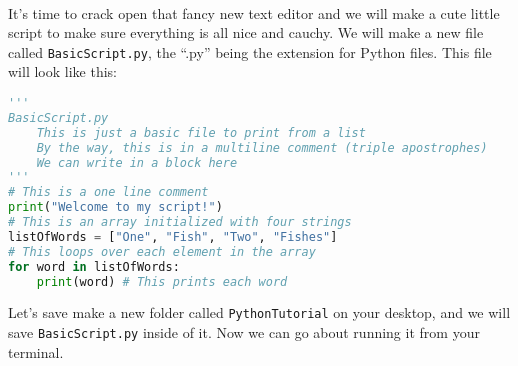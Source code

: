 \documentclass[12pt]{article}
\begin{document}
\\

It's time to crack open that fancy new text editor and we will make a cute little script to make sure everything is all nice and cauchy. We will make a new file called \texttt{BasicScript.py}, the ``.py'' being the extension for Python files. This file will look like this:\\
\begin{lstlisting}[language=Python]
'''
BasicScript.py
    This is just a basic file to print from a list
    By the way, this is in a multiline comment (triple apostrophes)
    We can write in a block here
'''
# This is a one line comment
print("Welcome to my script!")
# This is an array initialized with four strings
listOfWords = ["One", "Fish", "Two", "Fishes"]
# This loops over each element in the array
for word in listOfWords:
    print(word) # This prints each word
\end{lstlisting}
Let's save make a new folder called \texttt{PythonTutorial} on your desktop, and we will save \texttt{BasicScript.py} inside of it. Now we can go about running it from your terminal.\\

\\
\end{document}
